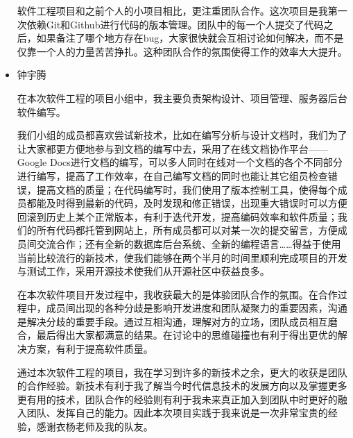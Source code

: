 \begin{itemize}
  \CJKindent 软件工程项目和之前个人的小项目相比，更注重团队合作。这次项目是我第一次依赖Git和Github进行代码的版本管理。团队中的每一个人提交了代码之后，如果备注了哪个地方存在bug，大家很快就会互相讨论如何解决，而不是仅靠一个人的力量苦苦挣扎。这种团队合作的氛围使得工作的效率大大提升。
  
  \item 钟宇腾
  
  \CJKindent 在本次软件工程的项目小组中，我主要负责架构设计、项目管理、服务器后台软件编写。
  
  \CJKindent 我们小组的成员都喜欢尝试新技术，比如在编写分析与设计文档时，我们为了让大家都更方便地参与到文档的编写中去，采用了在线文档协作平台—— Google Docs进行文档的编写，可以多人同时在线对一个文档的各个不同部分进行编写，提高了工作效率，在自己编写文档的同时也能让其它组员检查错误，提高文档的质量；在代码编写时，我们使用了版本控制工具，使得每个成员都能及时得到最新的代码，及时发现和修正错误，出现重大错误时可以方便回滚到历史上某个正常版本，有利于迭代开发，提高编码效率和软件质量；我们的所有代码都托管到网站上，所有成员都可以对某一次的提交留言，方便成员间交流合作；还有全新的数据库后台系统、全新的编程语言……得益于使用当前比较流行的新技术，使我们能够在两个半月的时间里顺利完成项目的开发与测试工作，采用开源技术使我们从开源社区中获益良多。
  
  \CJKindent 在本次软件项目开发过程中，我收获最大的是体验团队合作的氛围。在合作过程中，成员间出现的各种分歧是影响开发进度和团队凝聚力的重要因素，沟通是解决分歧的重要手段。通过互相沟通，理解对方的立场，团队成员相互磨合，最后得出大家都满意的结果。在讨论中的思维碰撞也有利于得出更优的解决方案，有利于提高软件质量。
  
  \CJKindent 通过本次软件工程的项目，我在学习到许多的新技术之余，更大的收获是团队的合作经验。新技术有利于我了解当今时代信息技术的发展方向以及掌握更多更有用的技术，团队合作的经验则有利于我未来真正加入到团队中时更好的融入团队、发挥自己的能力。因此本次项目实践于我来说是一次非常宝贵的经验，感谢衣杨老师及我的队友。

\end{itemize}
